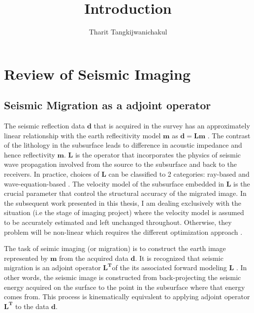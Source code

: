 \title{Introduction}
\author{Tharit Tangkijwanichakul}
\label{ch:chapter-intro}
\maketitle
{}


\section{Review of Seismic Imaging}

\subsection{Seismic Migration as a adjoint operator}

The seismic reflection data $\mathbf{d}$ that is acquired in the survey has an approximately linear relationship with the earth reflecitivity model $\mathbf{m}$ as $\mathbf{d=Lm}$ \cite[]{tarantola1984linearized, wiggins1972general}. The contrast of the lithology in the subsurface leads to difference in acoustic impedance and hence reflectivity $\mathbf{m}$. $\mathbf{L}$ is the operator that incorporates the physics of seismic wave propagation involved from the source to the subsurface and back to the receivers. In practice, choices of $\mathbf{L}$ can be classified to 2 categories: ray-based and wave-equation-based \cite[]{jones2014tutorial}. The velocity model of the subsurface embedded in $\mathbf{L}$ is the crucial parameter that control the structural accuracy of the migrated image. In the subsequent work presented in this thesis, I am dealing exclusively with the situation (i.e the stage of imaging project) where the velocity model is assumed to be accurately estimated and left unchanged throughout. Otherwise, they problem will be non-linear which requires the different optimization approach \cite[]{pica1990nonlinear}.

The task of seimic imaging (or migration) is to construct the earth image represented by $\mathbf{m}$ from the acquired data $\mathbf{d}$. It is recognized that seismic migration is an adjoint operator $\mathbf{L^T}$of the its associated forward modeling $\mathbf{L}$ \cite[]{claerbout1992earth}. In other words, the seismic image is constructed from back-projecting the seismic energy acquired on the surface to the point in the subsurface where that energy comes from. This process is kinematically equivalent to applying adjoint operator $\mathbf{L^T}$ to the data $\mathbf{d}$.

